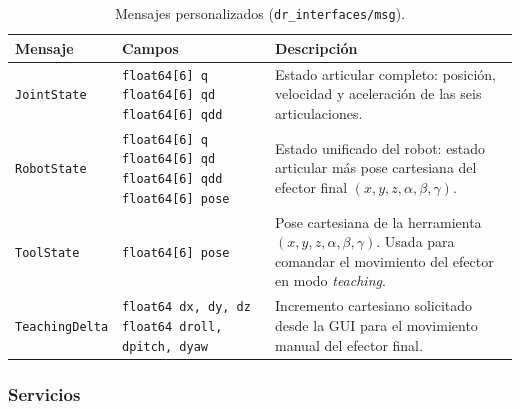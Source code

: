 \documentclass{article}
\begin{document}
\begin{table}[H]
    \centering
    \caption{Mensajes personalizados (\texttt{dr\_interfaces/msg}).}
    \label{tab:ros2_msgs}
    \renewcommand{\arraystretch}{1.3}
    \begin{tabular}{l p{4.5cm} p{5.5cm}}
        \toprule
        \textbf{Mensaje} & \textbf{Campos} & \textbf{Descripción} \\
        \midrule
        \texttt{JointState} &
            \texttt{float64[6] q} \newline
            \texttt{float64[6] qd} \newline
            \texttt{float64[6] qdd} &
            Estado articular completo: posición, velocidad y aceleración de las seis articulaciones. \\

        \texttt{RobotState} &
            \texttt{float64[6] q} \newline
            \texttt{float64[6] qd} \newline
            \texttt{float64[6] qdd} \newline
            \texttt{float64[6] pose} &
            Estado unificado del robot: estado articular más pose cartesiana del efector final $(x,y,z,\alpha,\beta,\gamma)$. \\

        \texttt{ToolState} &
            \texttt{float64[6] pose} &
            Pose cartesiana de la herramienta $(x,y,z,\alpha,\beta,\gamma)$. Usada para comandar el movimiento del efector en modo \textit{teaching}. \\

        \texttt{TeachingDelta} &
            \texttt{float64 dx, dy, dz} \newline
            \texttt{float64 droll, dpitch, dyaw} &
            Incremento cartesiano solicitado desde la GUI para el movimiento manual del efector final. \\
        \bottomrule
    \end{tabular}
\end{table}

\subsubsection*{Servicios}
\end{document}
